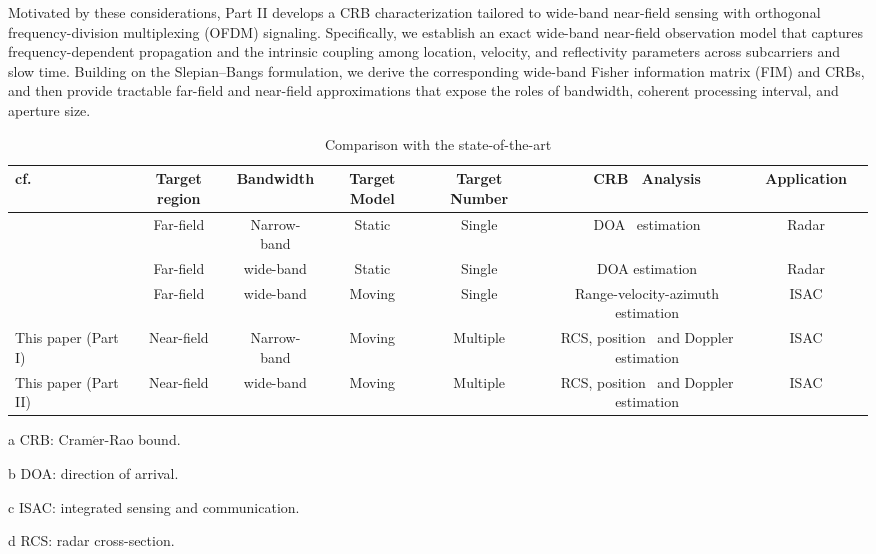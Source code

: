\documentclass[9pt,final,journal,twocolumn]{IEEEtran}
\begin{document}
Motivated by these considerations, Part II develops a CRB characterization tailored to wide-band near-field sensing with orthogonal frequency-division multiplexing (OFDM) signaling. Specifically, we establish an exact wide-band near-field observation model that captures frequency-dependent propagation and the intrinsic coupling among location, velocity, and reflectivity parameters across subcarriers and slow time. Building on the Slepian–Bangs formulation, we derive the corresponding wide-band Fisher information matrix (FIM) and CRBs, and then provide tractable far-field and near-field approximations that expose the roles of bandwidth, coherent processing interval, and aperture size.

\begin{table}
\centering
\caption{Comparison with the state-of-the-art}
\vspace{-0.1cm}
\label{tbl:priorcomp}
\scriptsize
\begin{threeparttable}
\begin{tabular}{l|c|c|c|c|c|c|l}
\hline cf.                 & Target region & Bandwidth & Target Model & Target Number & CRB\tnote{a} ~Analysis &  Application    \\
\hline 
\hline 
\cite{wang2017coarrays}    &Far-field  & Narrow-band & Static &Single & DOA\tnote{b} ~estimation  & Radar   \\
\hline 
\cite{liang2021CramerRao}  &Far-field  & wide-band   & Static &Single & DOA estimation  & Radar  \\
\hline 
\cite{hu2024joint}         &Far-field & wide-band    & Moving &Single & Range-velocity-azimuth estimation  & ISAC\tnote{c} \\
\hline
This paper (Part I)       &Near-field & Narrow-band   & Moving &Multiple & RCS\tnote{d}, position ~and Doppler estimation  & ISAC \\
\hline
This paper (Part II)      &Near-field & wide-band   & Moving &Multiple & RCS\tnote{d}, position ~and Doppler estimation  & ISAC \\
\hline
\end{tabular}
    \begin{tablenotes}[para]
	\item[a] CRB: Cram$\acute{\mathrm e}$r-Rao bound.
	\item[b] DOA: direction of arrival.
	\item[c] ISAC: integrated sensing and communication.
	\item[d] RCS: radar cross-section.
	\end{tablenotes}
    \end{threeparttable}
    \normalsize
    \vspace{-1em}    
\end{table}
\vspace{-0.2cm}
\end{document}

